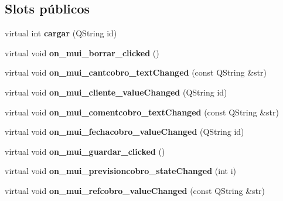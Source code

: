 \subsection*{Slots p\'{u}blicos}
\begin{CompactItemize}
\item 
virtual int {\bf cargar} (QString id)\label{classCobroView_i0}

\item 
virtual void {\bf on\_\-mui\_\-borrar\_\-clicked} ()\label{classCobroView_i1}

\item 
virtual void {\bf on\_\-mui\_\-cantcobro\_\-text\-Changed} (const QString \&str)\label{classCobroView_i2}

\item 
virtual void {\bf on\_\-mui\_\-cliente\_\-value\-Changed} (QString id)\label{classCobroView_i3}

\item 
virtual void {\bf on\_\-mui\_\-comentcobro\_\-text\-Changed} (const QString \&str)\label{classCobroView_i4}

\item 
virtual void {\bf on\_\-mui\_\-fechacobro\_\-value\-Changed} (QString id)\label{classCobroView_i5}

\item 
virtual void {\bf on\_\-mui\_\-guardar\_\-clicked} ()\label{classCobroView_i6}

\item 
virtual void {\bf on\_\-mui\_\-previsioncobro\_\-state\-Changed} (int i)\label{classCobroView_i7}

\item 
virtual void {\bf on\_\-mui\_\-refcobro\_\-value\-Changed} (const QString \&str)\label{classCobroView_i8}

\end{CompactItemize}

